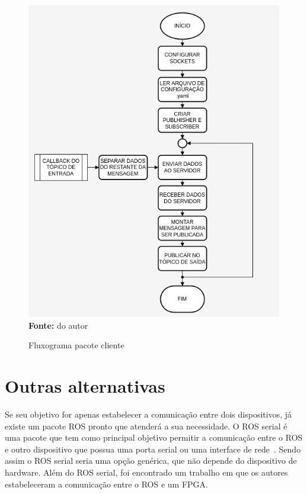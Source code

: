 \begin{figure}[ht]
	\caption{Fluxograma pacote cliente}
	\begin{center}
		\includegraphics[scale=0.47]{imagens/fluxogramaCliente.png}\\
		{\small \textbf{Fonte:} do autor}
    \end{center}\label{fig:clientfluxo}
\end{figure}


\section{Outras alternativas}

Se seu objetivo for apenas estabelecer a comunicação entre dois dispositivos, já existe um pacote ROS pronto que atenderá a sua necessidade. O ROS serial é uma pacote que tem como principal objetivo permitir a comunicação entre o ROS e outro dispositivo que possua uma porta serial ou uma interface de rede~\cite{RosSeria}. Sendo assim o ROS serial seria uma opção genérica, que não depende do dispositivo de hardware. Além do ROS serial, foi encontrado um trabalho em que os autores estabeleceram a comunicação entre o ROS e um FPGA\@. 

